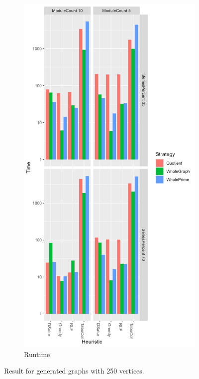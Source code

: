 \documentclass[a4paper]{article}
\begin{document}
\begin{figure}[p]
\begin{subfigure}{\resultbase}
    \end{subfigure}%
    \begin{subfigure}{\resultbase}
        \includegraphics[width=\columnwidth]{Tables/250Time.png}
      \caption{Runtime}
      \label{fig:250t}
    \end{subfigure}
\caption{Result for generated graphs with 250 vertices. \facfigdesc}
\label{fig:250}
\end{figure}
\end{document}
